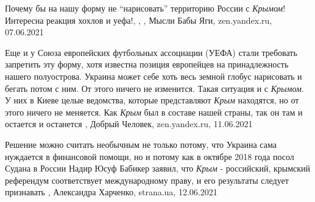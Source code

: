 Почему бы на нашу форму не \enquote{нарисовать} территорию России с \emph{Крымом}! Интересна реакция хохлов и уефа!,
,
, Мысли Бабы Яги, zen.yandex.ru, 07.06.2021

Еще и у Союза европейских футбольных ассоциации (УЕФА) стали требовать
запретить эту форму, хотя известна позиция европейцев на принадлежность нашего
полуострова. Украина может себе хоть весь земной глобус нарисовать и бегать
потом с ним. От этого ничего не изменится. Такая ситуация и с \emph{Крымом}. У них в
Киеве целые ведомства, которые представляют \emph{Крым} находятся, но от этого ничего
не меняется. Как \emph{Крым} был в составе нашей страны, так он там и остается и
останется
, 
Добрый Человек, zen.yandex.ru, 11.06.2021

Решение можно считать необычным не только потому, что Украина сама нуждается в
финансовой помощи, но и потому как в октябре 2018 года посол Судана в России
Надир Юсуф Бабикер заявил, что \emph{Крым} - российский, крымский референдум
соответствует международному праву, и его результаты следует признавать
, 
Александра Харченко, strana.ua, 12.06.2021

